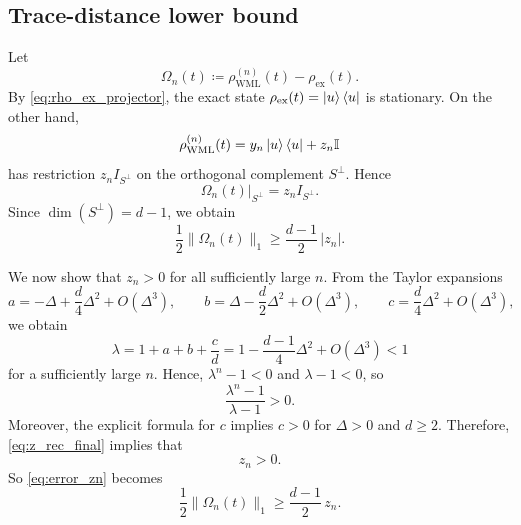 \documentclass[superscriptaddress,amsmath,amssymb,aps,pra,letterpaper,tightenlines,notitlepages,12pt]{revtex4-2}
\begin{document}
\subsection{Trace-distance lower bound}
Let
\begin{equation}
\Omega_n(t)\coloneqq \rho_{\mathrm{WML}}^{(n)}(t)-\rho_{\mathrm{ex}}(t).
\end{equation}
By \eqref{eq:rho_ex_projector}, the exact state $\rho_{\mathrm{ex}}(t) = \ket{u}\bra{u}$ is stationary.
On the other hand,
\begin{equation}
\rho_{\mathrm{WML}}^{(n)}(t)=y_n\ket{u}\bra{u}+z_n\mathbb I
\end{equation}
has restriction $z_nI_{S^\perp}$ on the orthogonal complement $S^\perp$. Hence
\begin{equation}
\Omega_n(t)\big|_{S^\perp}=z_nI_{S^\perp}.
\end{equation}
Since $\dim(S^\perp)=d-1$, we obtain
\begin{equation}
\frac{1}{2}\|\Omega_n(t)\|_1 \ge \frac{d-1}{2}\,|z_n|.
\label{eq:error_zn}
\end{equation}

We now show that $z_n>0$ for all sufficiently large $n$.
From the Taylor expansions
\begin{equation}
a=-\Delta+\frac d4\Delta^2+O(\Delta^3),
\qquad
b=\Delta-\frac d2\Delta^2+O(\Delta^3),
\qquad
c=\frac d4\Delta^2+O(\Delta^3),
\end{equation}
we obtain
\begin{equation}
\lambda = 1+a+b+\frac cd
= 1-\frac{d-1}{4}\Delta^2+O(\Delta^3)<1
\end{equation}
for a sufficiently large $n$. Hence, $\lambda^n-1<0$ and $\lambda-1<0$, so
\begin{equation}
\frac{\lambda^n-1}{\lambda-1}>0.
\end{equation}
Moreover, the explicit formula for $c$ implies $c>0$ for $\Delta>0$ and $d\ge2$.
Therefore, \eqref{eq:z_rec_final} implies that
\begin{equation}
z_n>0.
\end{equation}
So \eqref{eq:error_zn} becomes
\begin{equation}
\frac{1}{2}\|\Omega_n(t)\|_1
\ge
\frac{d-1}{2}\,z_n.
\label{eq:error_zn_positive}
\end{equation}
\end{document}
